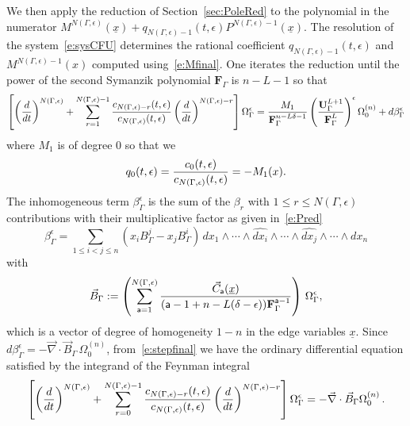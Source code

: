 \documentclass[a4paper,12pt]{article}
\numberwithin{equation}{section}
\numberwithin{figure}{section}
\begin{document}
We then apply the reduction of Section~\ref{sec:PoleRed} to
the polynomial in the numerator
$M^{
      N(\Gamma,\epsilon)}(\underline x)+q_{N(\Gamma,\epsilon)-1}(t,\epsilon)
    P^{N(\Gamma,\epsilon)-1}(\underline x)$.
The resolution of the
system~\eqref{e:sysCFU} determines the  rational coefficient
$q_{N(\Gamma,\epsilon)-1}(t,\epsilon)$ and
$M^{N(\Gamma,\epsilon)-1}(x)$ computed using~\eqref{e:Mfinal}. One
iterates the reduction until the power of  the second Symanzik
polynomial $\textbf{F}_\Gamma$ is $n-L-1$ so
that
\begin{equation}\label{e:stepfinal}
\left[\left(d\over dt\right)^{N(\Gamma,\epsilon)}
  +\sum_{r=1}^{N(\Gamma,\epsilon)-1}
  {c_{N(\Gamma,\epsilon)-r}(t,\epsilon)\over c_{N(\Gamma,\epsilon)}(t,\epsilon)} \left(d\over dt\right)^{N(\Gamma,\epsilon)-r}\right] \Omega_\Gamma^\epsilon= {M_{1}\over
    \textbf{F}_\Gamma^{n-L\delta-1}
  }\left(\textbf{U}_\Gamma^{L+1}\over \textbf{F}_\Gamma^L
  \right)^\epsilon \Omega_0^{(n)}+ d\beta_\Gamma^\epsilon 
\end{equation}
where $M_1$ is of degree 0 so that we
\begin{equation}
  q_0(t,\epsilon)=  {c_{0}(t,\epsilon)\over c_{N(\Gamma,\epsilon)}(t,\epsilon)}= -M_1(x)  .
\end{equation}
The inhomogeneous term  $\beta_\Gamma^\epsilon $ is the sum of the
$\beta_r$ with $1\leq
r\leq N(\Gamma,\epsilon)$
contributions with their multiplicative factor as given
in~\eqref{e:Pred}
\begin{equation}
  \label{e:betaGamma}
  \beta_\Gamma^\epsilon= \sum_{1\leq i<j\leq n} (x_i B^j_\Gamma- x_j B^i_\Gamma) \,
  dx_1\wedge \cdots \wedge \widehat{dx_i}\wedge \cdots \wedge\widehat{dx_j}\wedge
  \cdots \wedge dx_n 
\end{equation}
with
\begin{equation}
  \label{e:BetaGamma}
  \vec B_\Gamma:=\left(\sum_{\mathsf{a}=1}^{N(\Gamma,\epsilon)} {
      \vec C_{\mathsf{a}} (\underline x) \over
   ( \mathsf{a}-1+n-L(\delta-\epsilon))\mathbf{F}_\Gamma^{\mathsf{a}-1}}\right) \,\Omega_\Gamma^\epsilon ,
\end{equation}
which is a vector of degree of homogeneity $1-n$ in the edge variables
$\underline x$.
Since $d\beta_\Gamma^\epsilon= -\vec\nabla\cdot \vec B_\Gamma\,
\Omega_0^{(n)}$, from~\eqref{e:stepfinal} we have the ordinary
differential equation satisfied by the integrand of the Feynman
integral
\begin{equation}\label{e:stepfinalode}
\left[\left(d\over dt\right)^{N(\Gamma,\epsilon)}
  +\sum_{r=0}^{N(\Gamma,\epsilon)-1}
  {c_{N(\Gamma,\epsilon)-r}(t,\epsilon)\over c_{N(\Gamma,\epsilon)}(t,\epsilon)} \left(d\over dt\right)^{N(\Gamma,\epsilon)-r}\right] \Omega_\Gamma^\epsilon =-\vec\nabla\cdot \vec B_\Gamma\Omega_0^{(n)}\,.
\end{equation}
\end{document}
